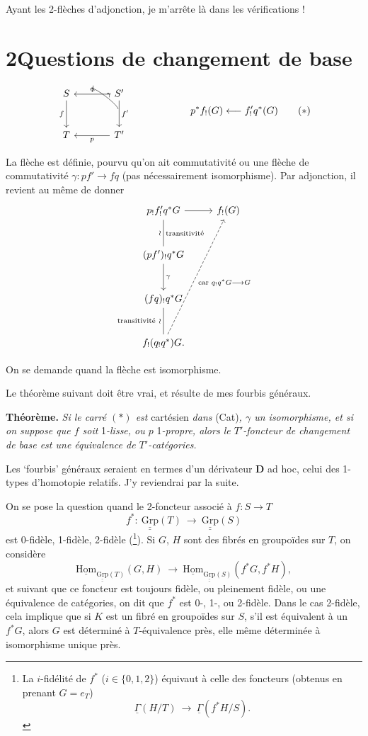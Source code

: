 \documentclass[11pt]{article}
\newcommand{\printedpage}[1]{\marginpar{\footnotesize p.~#1}}
\newcommand{\msp}[1]{\marginpar{\footnotesize [#1]}}
\newcommand{\uHom}{\underline{\mathrm{Hom}}}
\newcommand{\uuGrp}{\underline{\underline{\mathrm{Grp}}}}
\newcommand{\fl}{\longrightarrow}
\begin{document}
Ayant les 2-flèches d'adjonction, je m'arrête là dans les vérifications !

\printedpage{6}

\section*{2\quad Questions de changement de base}

\[
\begin{tikzcd}[column sep=large, row sep=large]
S & S' \arrow[l, "q"'] \arrow[d, "f'"] \\
T \arrow[from=1-1, "f"'] & T' \arrow[l, "p"]
\arrow[from=2-2, to=1-1, bend right=50, shorten <=18pt, shorten >=18pt, "\gamma"']
\end{tikzcd}
\qquad\qquad\qquad
p^*f_!(G) \longleftarrow f'_!q^*(G)
\tag*{$(*)$}
\]

La flèche est définie, pourvu qu'on ait commutativité ou une flèche de commutativité $\gamma : pf' \fl fq$ (pas nécessairement isomorphisme). Par adjonction, il revient au même de donner
\[
\begin{tikzcd}[row sep=large]
p_!f'_!q^*G \arrow[r] \arrow[d, dash, "\wr"', "\text{transitivité}"] & f_!(G) \\
(pf')_!q^*G \arrow[d, "\gamma"] & \\
(fq)_!q^*G \arrow[d, dash, "\text{transitivité}\ \wr"'] & \\
f_!(q_!q^*)G. \arrow[uuur, dashed, "\text{car } q_!q^*G \longrightarrow G"'] &
\end{tikzcd}
\]

On se demande quand la flèche est isomorphisme.

\msp{page 7}
Le théorème suivant doit être vrai, et résulte de mes fourbis généraux.

\textbf{Théorème.} \textit{Si le carré $(*)$ est} cartésien \textit{dans} (Cat)\textit{, $\gamma$ un isomorphisme, et si on suppose que $f$ soit} 1\textit{-lisse, ou $p$} 1\textit{-propre, alors le $T'$-foncteur de changement de base est une équivalence de $T'$-catégories.}

Les ‘fourbis’ généraux seraient en termes d'un dérivateur $\mathbf{D}$ ad hoc, celui des 1-types d'homotopie relatifs. J'y reviendrai par la suite.

On se pose la question quand le 2-foncteur associé à $f : S \fl T$
\[
f^* :\ \uuGrp(T) \ \fl\ \uuGrp(S)
\]
\printedpage{7}
est 0-fidèle, 1-fidèle, 2-fidèle (\footnote[2]{La $i$-fidélité de $f^*$ ($i \in \{0,1,2\}$) équivaut à celle des foncteurs (obtenus en prenant $G = e_T$)
\[
\underline{\Gamma}(H/T) \ \fl\ \underline{\Gamma}(f^*H/S).
\]}). Si $G$, $H$ sont des fibrés en groupoïdes sur $T$, on considère
\[
\uHom_{\uuGrp(T)}(G,H) \ \fl\ \uHom_{\uuGrp(S)}(f^*G, f^*H),
\]
et suivant que ce foncteur est toujours fidèle, ou pleinement fidèle, ou une équivalence de catégories, on dit que $f^*$ est 0-, 1-, ou 2-fidèle. Dans le cas 2-fidèle, cela implique que si $K$ est un fibré en groupoïdes sur $S$, s'il est équivalent à un $f^*G$, alors $G$ est déterminé à $T$-équivalence près, elle même déterminée à isomorphisme unique près.
\end{document}
